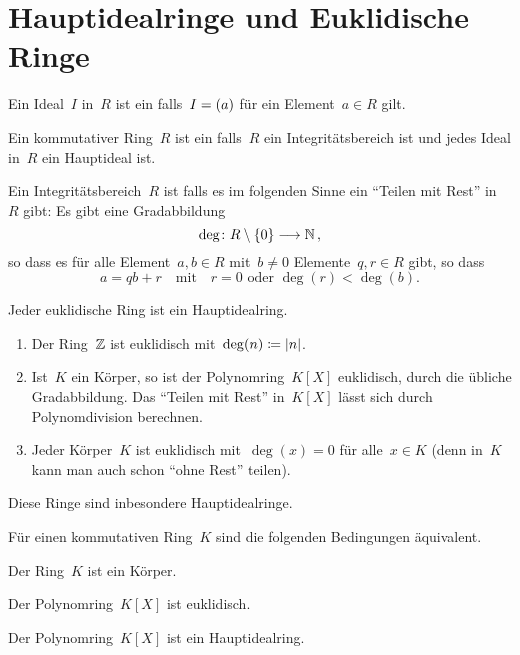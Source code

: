 \section{Hauptidealringe und Euklidische Ringe}

\begin{definition}
  Ein Ideal~$I$ in~$R$ ist ein  falls~$I = (a)$ für ein Element~$a \in R$ gilt.
\end{definition}

\begin{definition}
  Ein kommutativer Ring~$R$ ist ein  falls~$R$ ein Integritätsbereich ist und jedes Ideal in~$R$ ein Hauptideal ist.
\end{definition}

\begin{definition}
  Ein Integritätsbereich~$R$ ist  falls es im folgenden Sinne ein \enquote{Teilen mit Rest} in~$R$ gibt:
  Es gibt eine Gradabbildung
  \[
    \deg
    \colon
    R \setminus \{ 0 \}
    \to
    \Natural \,,
  \]
  so dass es für alle Element~$a, b \in R$ mit~$b \neq 0$ Elemente~$q, r \in R$ gibt, so dass~
  \[
    a = qb + r
    \quad\text{mit}\quad
    \text{$r = 0$ oder~$\deg(r) < \deg(b)$.}
  \]
\end{definition}

\begin{proposition}
  Jeder euklidische Ring ist ein Hauptidealring.
\end{proposition}

\begin{example}
  \leavevmode
  \begin{enumerate}
    \item
      Der Ring~$\mathbb{Z}$ ist euklidisch mit~$\deg(n) \coloneqq \lvert n\rvert$.
    \item
      Ist~$K$ ein Körper, so ist der Polynomring~$K[X]$ euklidisch, durch die übliche Gradabbildung.
      Das \enquote{Teilen mit Rest} in~$K[X]$ lässt sich durch Polynomdivision berechnen.
    \item
      Jeder Körper~$K$ ist euklidisch mit~$\deg(x) = 0$ für alle~$x \in K$ (denn in~$K$ kann man auch schon \enquote{ohne Rest} teilen).
  \end{enumerate}
  Diese Ringe sind inbesondere Hauptidealringe.
\end{example}

\begin{proposition}
  Für einen kommutativen Ring~$K$ sind die folgenden Bedingungen äquivalent.
  \begin{equivlist}
    \item
      Der Ring~$K$ ist ein Körper.
    \item
      Der Polynomring~$K[X]$ ist euklidisch.
    \item
      Der Polynomring~$K[X]$ ist ein Hauptidealring.
  \end{equivlist}
\end{proposition}


